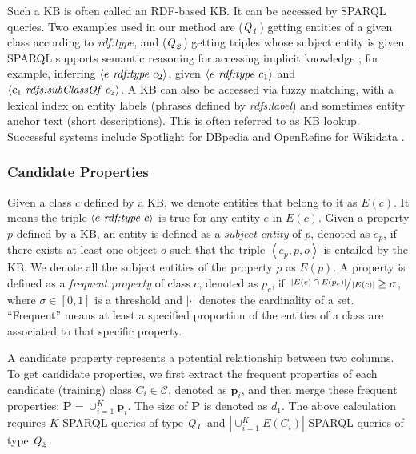 \documentclass{article}
\begin{document}
Such a KB is often called an RDF-based KB. 
It can be accessed by SPARQL queries.
Two examples used in our method are ($\text{\textit{Q}}_\text{\textit{1}}$) getting entities of a given class according to \textit{rdf:type},
and ($\text{\textit{Q}}_\text{\textit{2}}$) getting triples whose subject entity is given.
SPARQL supports semantic reasoning for accessing implicit knowledge \cite{glimm2012sparql};
for example, inferring $\left\langle e \text{ \textit{rdf:type} } c_2 \right\rangle$,
given $\left\langle e \text{ \textit{rdf:type} } c_1 \right\rangle$ and $\left\langle c_1 \text{ \textit{rdfs:subClassOf} } c_2 \right\rangle$.
A KB can also be accessed via fuzzy matching,
with a lexical index on entity labels (phrases defined by \textit{rdfs:label}) and sometimes entity anchor text (short descriptions).
This is often referred to as KB lookup.
Successful systems include Spotlight for DBpedia \cite{mendes2011dbpedia} and  OpenRefine for Wikidata \cite{ham2013openrefine}.

\subsubsection{Candidate Properties}
Given a class $c$ defined by a KB,
we denote entities that belong to it as $E(c)$.
It means the triple $\left\langle e \text{ \textit{rdf:type} } c\right\rangle$ is true 
for any entity $e$ in $E(c)$.
Given a property $p$ defined by a KB,
an entity is defined as a \textit{subject entity} of $p$, denoted as $e_p$, 
if there exists at least one object $o$ such that the triple $\left\langle e_p, p, o \right\rangle$ is entailed by the KB.
We denote all the subject entities of the property $p$ as $E(p)$.
A property is defined as a \textit{frequent property} of class $c$, denoted as $p_c$,
if $\sfrac{\left\vert E(c) \cap E(p_c) \right\vert}{\left\vert E(c) \right\vert} \ge \sigma$,
where $\sigma \in [0,1]$ is a threshold and $\left\vert \cdot \right\vert$ denotes the cardinality of a set.
``Frequent'' means at least a specified proportion of the entities of a class are associated to that specific property.

A candidate property represents a potential relationship between two columns.
To get candidate properties, 
we first extract the frequent properties of each candidate (training) class $C_i \in \mathcal{C}$, denoted as $\bm{p}_{i}$,
and then merge these frequent properties: 
$\bm{P} = \cup_{i=1}^{K} \bm{p}_{i}$.
The size of $\bm{P}$ is denoted as $d_1$.
The above calculation requires $K$ SPARQL queries of type $\text{\textit{Q}}_\text{\textit{1}}$ 
and $\left\vert \cup_{i=1}^K E(C_i) \right\vert$ SPARQL queries of type $\text{\textit{Q}}_\text{\textit{2}}$.
\end{document}
